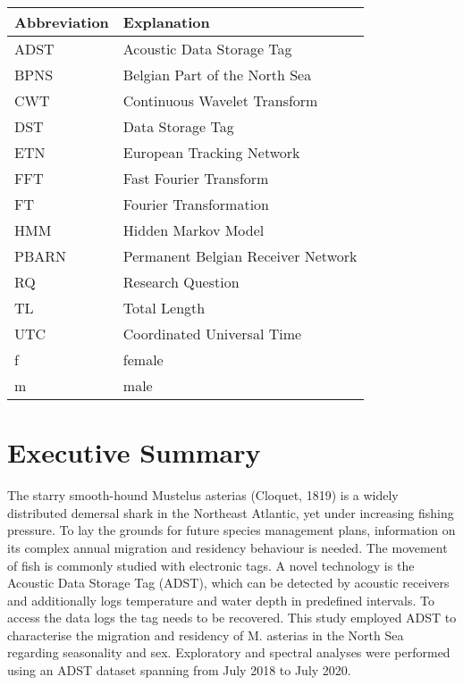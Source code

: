 \documentclass[
  authoryear,
  review,
  3p]{elsarticle}
\begin{document}
\begin{table}[!h]
\centering
\begin{tabular}{l|l}
\hline
Abbreviation & Explanation\\
\hline
ADST & Acoustic Data Storage Tag\\
\hline
BPNS & Belgian Part of the North Sea\\
\hline
CWT & Continuous Wavelet Transform\\
\hline
DST & Data Storage Tag\\
\hline
ETN & European Tracking Network\\
\hline
FFT & Fast Fourier Transform\\
\hline
FT & Fourier Transformation\\
\hline
HMM & Hidden Markov Model\\
\hline
PBARN & Permanent Belgian Receiver Network\\
\hline
RQ & Research Question\\
\hline
TL & Total Length\\
\hline
UTC & Coordinated Universal Time\\
\hline
f & female\\
\hline
m & male\\
\hline
\end{tabular}
\end{table}

\newpage{}

\hypertarget{executive-summary}{%
\section{Executive Summary}\label{executive-summary}}

The starry smooth-hound Mustelus asterias (Cloquet, 1819) is a widely
distributed demersal shark in the Northeast Atlantic, yet under
increasing fishing pressure. To lay the grounds for future species
management plans, information on its complex annual migration and
residency behaviour is needed. The movement of fish is commonly studied
with electronic tags. A novel technology is the Acoustic Data Storage
Tag (ADST), which can be detected by acoustic receivers and additionally
logs temperature and water depth in predefined intervals. To access the
data logs the tag needs to be recovered. This study employed ADST to
characterise the migration and residency of M. asterias in the North Sea
regarding seasonality and sex. Exploratory and spectral analyses were
performed using an ADST dataset spanning from July 2018 to July 2020.
\end{document}

